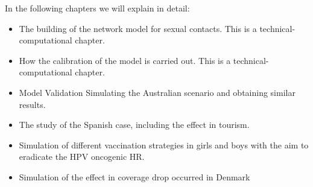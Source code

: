 In the following chapters we will explain in detail: 
\begin{itemize}
	\item The building of the network model for sexual contacts. This is a technical-computational chapter.
	\item How the calibration of the model is carried out. This is a technical-computational chapter.
	\item Model Validation Simulating the Australian scenario and obtaining similar results.
	\item The study of the Spanish case, including the effect in tourism.
	\item Simulation of different vaccination strategies in girls and boys with the aim to eradicate the HPV oncogenic HR.
	\item Simulation of the effect in coverage drop occurred in Denmark
\end{itemize}